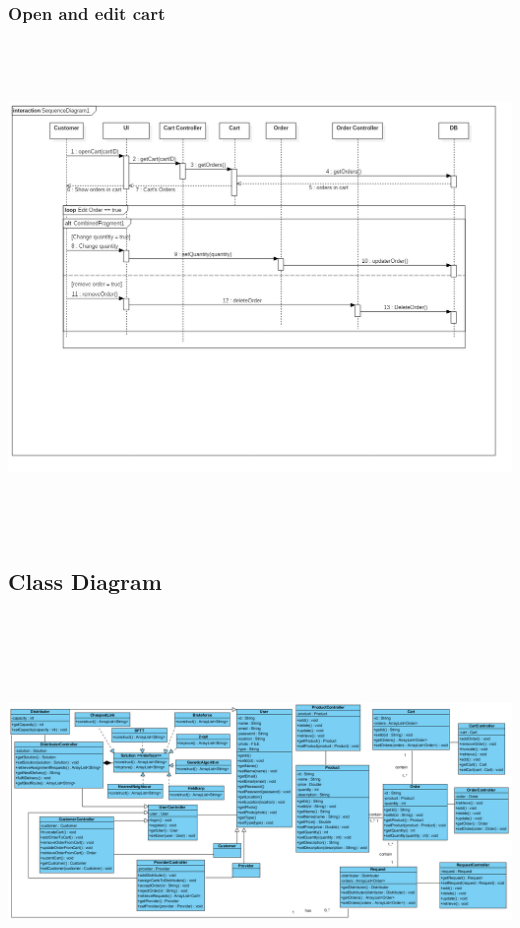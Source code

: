 \documentclass[12pt]{article}
\begin{document}
\subsubsection{ Open and edit cart }
\begin{center}
	\includegraphics[width=17cm,height=13cm]{./assets/sequencediagram/openandeditcart.png}\\
\end{center}
\newpage

\subsection{ Class Diagram }

\begin{center}
    \includegraphics[width=17cm,height=10.5cm]{./assets/class-diagram.png}
\end{center}
\newpage
\end{document}
